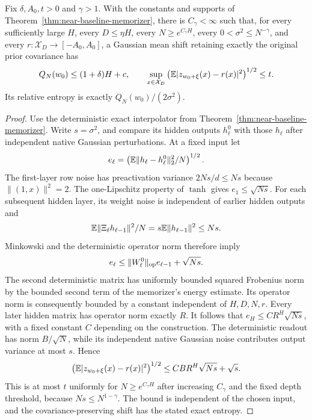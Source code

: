 \begin{corollary}
\label{cor:near-baseline-native-small-noise}
Fix $\delta,A_0,t>0$ and $\gamma>1$. With the constants and supports of Theorem~\ref{thm:near-baseline-memorizer}, there is $C_\gamma<\infty$ such that, for every sufficiently large $H$, every $D\le\eta H$, every $N\ge e^{C_\gamma H}$, every $0<\sigma^2\le N^{-\gamma}$, and every $r:\mathcal X_D\to[-A_0,A_0]$, a Gaussian mean shift retaining exactly the original prior covariance has
\[
 Q_N(w_0)\le(1+\delta)H+c,\qquad
 \sup_{x\in\mathcal X_D}
 \left(\mathbb E|z_{w_0+\xi}(x)-r(x)|^2\right)^{1/2}\le t.
\]
Its relative entropy is exactly $Q_N(w_0)/(2\sigma^2)$.
\end{corollary}
\begin{proof}
Use the deterministic exact interpolator from Theorem~\ref{thm:near-baseline-memorizer}. Write $s=\sigma^2$, and compare its hidden outputs $h_\ell^0$ with those $h_\ell$ after independent native Gaussian perturbations. At a fixed input let
\[
 e_\ell=\left(\mathbb E\|h_\ell-h_\ell^0\|_2^2/N\right)^{1/2}.
\]
The first-layer row noise has preactivation variance $2Ns/d\le Ns$ because $\|(1,x)\|^2=2$. The one-Lipschitz property of $\tanh$ gives $e_1\le\sqrt{Ns}$. For each subsequent hidden layer, its weight noise is independent of earlier hidden outputs and
\[
 \mathbb E\|\Xi_\ell h_{\ell-1}\|^2/N
       =s\mathbb E\|h_{\ell-1}\|^2\le Ns.
\]
Minkowski and the deterministic operator norm therefore imply
\[
 e_\ell\le\|W_\ell^0\|_{\rm op}e_{\ell-1}+\sqrt{Ns}.
\]
The second deterministic matrix has uniformly bounded squared Frobenius norm by the bounded second term of the memorizer's energy estimate. Its operator norm is consequently bounded by a constant independent of $H,D,N,r$. Every later hidden matrix has operator norm exactly $R$. It follows that $e_H\le C R^H\sqrt{Ns}$, with a fixed constant $C$ depending on the construction. The deterministic readout has norm $B/\sqrt N$, while its independent native Gaussian noise contributes output variance at most $s$. Hence
\[
 \left(\mathbb E|z_{w_0+\xi}(x)-r(x)|^2\right)^{1/2}
 \le CB R^H\sqrt{Ns}+\sqrt s.
\]
This is at most $t$ uniformly for $N\ge e^{C_\gamma H}$ after increasing $C_\gamma$ and the fixed depth threshold, because $Ns\le N^{1-\gamma}$. The bound is independent of the chosen input, and the covariance-preserving shift has the stated exact entropy.
\end{proof}
